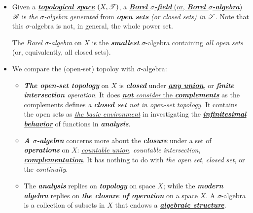 \documentclass[11pt]{article}
\begin{document}
\begin{itemize}
\item \begin{definition}
Given a \underline{\emph{\textbf{topological space}}} $(X, {\mathscr T})$, a \underline{\emph{\textbf{Borel $\sigma$-field}} (or, \emph{\textbf{Borel $\sigma$-algebra}}) ${\mathscr B}$} is \emph{the $\sigma$-algebra} \emph{generated} from \emph{\textbf{open sets} (or closed sets) in ${\mathscr T}$}. Note that this $\sigma$-algebra is not, in general, the whole power set. 

The \emph{Borel $\sigma$-algebra} on $X$ is the \emph{\textbf{smallest}} $\sigma$-algebra containing \emph{all open sets} (or, equivalently, all closed sets).
\end{definition}

\item \begin{remark} We compare the (open-set) topoloy with $\sigma$-algebra: 
\begin{itemize}
\item  \emph{\textbf{The open-set topology}} on $X$ is \emph{\textbf{closed}} under \underline{\emph{\textbf{any union}}}, or \emph{\textbf{finite intersection} operation}. It does \underline{\emph{\textbf{not} consider} the \emph{\textbf{complements}}} as the complements defines \emph{a \textbf{closed set}} \emph{not in open-set topology}. It contains the open sets as \underline{\emph{the basic environment}} in investigating the \underline{\emph{\textbf{infinitesimal behavior}}} of functions in \emph{\textbf{analysis}}. 

\item \emph{\textbf{A $\sigma$-algebra}} concerns more about the \emph{\textbf{closure}} under a set of \emph{\textbf{operations}} on $X$: \underline{\emph{countable union}}, \emph{countable intersection}, \underline{\emph{\textbf{complementation}}}. It has nothing to do with \emph{the open set}, \emph{closed set}, or the \emph{continuity}.

\item The \emph{\textbf{analysis}} replies on \emph{\textbf{topology}} on space $X$; while the \emph{\textbf{modern algebra}} replies on \emph{\textbf{the closure of operation}} on a space $X$.  A $\sigma$-algebra is a collection of subsets in $X$ that endows a \underline{\emph{\textbf{algebraic structure}}}.   
\end{itemize}
\end{remark}


\end{itemize}
\end{document}
